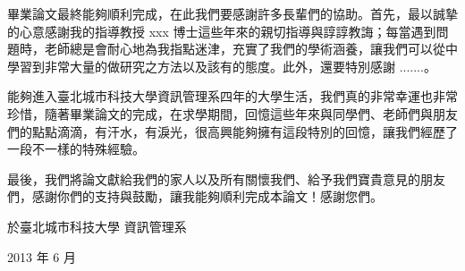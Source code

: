 畢業論文最終能夠順利完成，在此我們要感謝許多長輩們的協助。首先，最以誠摯的心意感謝我的指導教授 xxx 博士這些年來的親切指導與諄諄教誨；每當遇到問題時，老師總是會耐心地為我指點迷津，充實了我們的學術涵養，讓我們可以從中學習到非常大量的做研究之方法以及該有的態度。此外，還要特別感謝 .......。

能夠進入臺北城市科技大學資訊管理系四年的大學生活，我們真的非常幸運也非常珍惜，隨著畢業論文的完成，在求學期間，回憶這些年來與同學們、老師們與朋友們的點點滴滴，有汗水，有淚光，很高興能夠擁有這段特別的回憶，讓我們經歷了一段不一樣的特殊經驗。

最後，我們將論文獻給我們的家人以及所有關懷我們、給予我們寶貴意見的朋友們，感謝你們的支持與鼓勵，讓我能夠順利完成本論文！感謝您們。

於臺北城市科技大學 資訊管理系

2013 年 6 月
